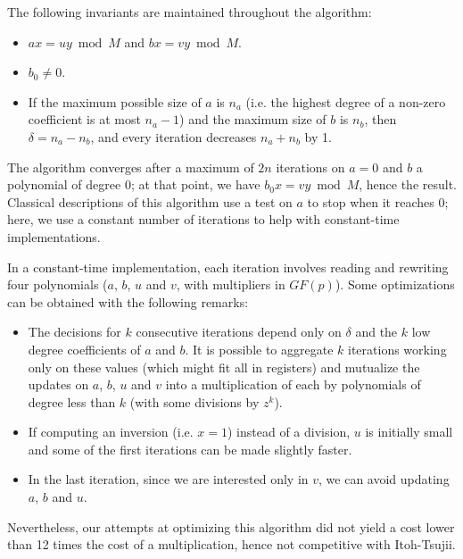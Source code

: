 \documentclass{llncs}
\newcommand{\GF}{GF}
\begin{document}
The following invariants are maintained throughout the algorithm:
\begin{itemize}

    \item $ax = uy \bmod M$ and $bx = vy \bmod M$.

    \item $b_0 \neq 0$.

    \item If the maximum possible size of $a$ is $n_a$ (i.e. the highest
    degree of a non-zero coefficient is at most $n_a-1$) and the maximum
    size of $b$ is $n_b$, then $\delta = n_a - n_b$, and every iteration
    decreases $n_a+n_b$ by 1.

\end{itemize}
The algorithm converges after a maximum of $2n$ iterations on $a = 0$
and $b$ a polynomial of degree 0; at that point, we have $b_0 x = vy
\bmod M$, hence the result. Classical descriptions of this algorithm use
a test on $a$ to stop when it reaches 0; here, we use a constant number
of iterations to help with constant-time implementations.

In a constant-time implementation, each iteration involves reading and
rewriting four polynomials ($a$, $b$, $u$ and $v$, with multipliers in
$\GF(p)$). Some optimizations can be obtained with the following remarks:
\begin{itemize}

    \item The decisions for $k$ consecutive iterations depend only on
    $\delta$ and the $k$ low degree coefficients of $a$ and $b$. It is
    possible to aggregate $k$ iterations working only on these values
    (which might fit all in registers) and mutualize the updates on $a$,
    $b$, $u$ and $v$ into a multiplication of each by polynomials of
    degree less than $k$ (with some divisions by $z^k$).

    \item If computing an inversion (i.e. $x = 1$) instead of a division,
    $u$ is initially small and some of the first iterations can be made
    slightly faster.

    \item In the last iteration, since we are interested only in $v$, we
    can avoid updating $a$, $b$ and $u$.

\end{itemize}

Nevertheless, our attempts at optimizing this algorithm did not yield a
cost lower than 12 times the cost of a multiplication, hence not
competitive with Itoh-Tsujii.
\end{document}
